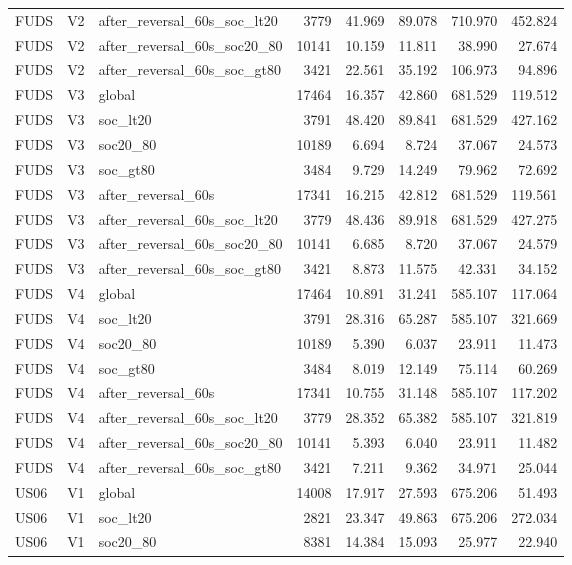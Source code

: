 \begin{tabular}{lllrrrrr}
FUDS & V2 & after\_reversal\_60s\_soc\_lt20 & 3779 & 41.969 & 89.078 & 710.970 & 452.824 \\
FUDS & V2 & after\_reversal\_60s\_soc20\_80 & 10141 & 10.159 & 11.811 & 38.990 & 27.674 \\
FUDS & V2 & after\_reversal\_60s\_soc\_gt80 & 3421 & 22.561 & 35.192 & 106.973 & 94.896 \\
FUDS & V3 & global & 17464 & 16.357 & 42.860 & 681.529 & 119.512 \\
FUDS & V3 & soc\_lt20 & 3791 & 48.420 & 89.841 & 681.529 & 427.162 \\
FUDS & V3 & soc20\_80 & 10189 & 6.694 & 8.724 & 37.067 & 24.573 \\
FUDS & V3 & soc\_gt80 & 3484 & 9.729 & 14.249 & 79.962 & 72.692 \\
FUDS & V3 & after\_reversal\_60s & 17341 & 16.215 & 42.812 & 681.529 & 119.561 \\
FUDS & V3 & after\_reversal\_60s\_soc\_lt20 & 3779 & 48.436 & 89.918 & 681.529 & 427.275 \\
FUDS & V3 & after\_reversal\_60s\_soc20\_80 & 10141 & 6.685 & 8.720 & 37.067 & 24.579 \\
FUDS & V3 & after\_reversal\_60s\_soc\_gt80 & 3421 & 8.873 & 11.575 & 42.331 & 34.152 \\
FUDS & V4 & global & 17464 & 10.891 & 31.241 & 585.107 & 117.064 \\
FUDS & V4 & soc\_lt20 & 3791 & 28.316 & 65.287 & 585.107 & 321.669 \\
FUDS & V4 & soc20\_80 & 10189 & 5.390 & 6.037 & 23.911 & 11.473 \\
FUDS & V4 & soc\_gt80 & 3484 & 8.019 & 12.149 & 75.114 & 60.269 \\
FUDS & V4 & after\_reversal\_60s & 17341 & 10.755 & 31.148 & 585.107 & 117.202 \\
FUDS & V4 & after\_reversal\_60s\_soc\_lt20 & 3779 & 28.352 & 65.382 & 585.107 & 321.819 \\
FUDS & V4 & after\_reversal\_60s\_soc20\_80 & 10141 & 5.393 & 6.040 & 23.911 & 11.482 \\
FUDS & V4 & after\_reversal\_60s\_soc\_gt80 & 3421 & 7.211 & 9.362 & 34.971 & 25.044 \\
US06 & V1 & global & 14008 & 17.917 & 27.593 & 675.206 & 51.493 \\
US06 & V1 & soc\_lt20 & 2821 & 23.347 & 49.863 & 675.206 & 272.034 \\
US06 & V1 & soc20\_80 & 8381 & 14.384 & 15.093 & 25.977 & 22.940 \\

\end{tabular}
